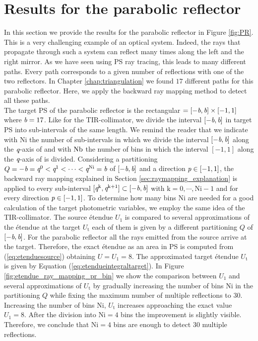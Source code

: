 \section{Results for the parabolic reflector}\label{sec:PR}
In this section we provide the results for the parabolic reflector in Figure \ref{fig:PR}.
This is a very challenging example of an optical system. Indeed, the rays that propagate through such a system can reflect many times along the left and the right mirror. As we have seen using PS ray tracing, this leads to many different paths. Every path corresponds to a given number of reflections with one of the two reflectors. In Chapter \ref{chap:triangulation} we found $17$ different paths for this parabolic reflector. Here, we apply the backward ray mapping method to detect all these paths. \\ \indent
The target PS of the parabolic reflector is the rectangular $=[-\textit{b}, \textit{b}]\times[-1,1]$ where $\textit{b}=17$. Like for the TIR-collimator, we divide the interval $[-\textit{b}, \textit{b}]$ in target PS into sub-intervals of the same length. We remind the reader that we indicate with $\textrm{Ni}$ the number of sub-intervals in which we divide the interval $[-\textit{b}, \textit{b}]$ along the $\textit{q}$-axis of  and with $\textrm{Nb}$ the number of bins in which the interval $[-1,1]$ along the $\textit{q}$-axis of  is divided. Considering a partitioning $Q = -\textit{b}=\textit{q}^{0}<\textit{q}^{1}<\cdots<\textit{q}^{\textrm{Ni}}=\textit{b}$ of $[-\textit{b}, \textit{b}]$ and a direction $\textit{p}\in[-1,1]$, the backward ray mapping explained in Section \ref{sec:raymapping_explanation} is applied to every sub-interval $[\textit{q}^{\textrm{k}}, \textit{q}^{\textrm{k+1}}]\subset[-\textit{b}, \textit{b}]$ with $\textrm{k}=0, \cdots, \textrm{Ni}-1$ and for every direction $\textit{p}\in[-1,1]$. To determine how many bins $\textrm{Ni}$ are needed for a good calculation of the target photometric variables, we employ the same idea of the TIR-collimator. The source \'{e}tendue $U_1$ is compared to several approximations of the \'{e}tendue at the target $U_{\textrm{t}}$ each of them is given by a different partitioning $Q$ of $[-\textit{b}, \textit{b}]$. For the parabolic reflector all the rays emitted from the source arrive at the target. Therefore, the exact \'{e}tendue as an area in PS is computed from (\ref{eq:etenduesource}) obtaining $U=U_1=8$. The approximated target \'{e}tendue $U_{\textrm{t}}$ is given by Equation (\ref{eq:etendueintegraltarget}). In Figure \ref{fig:etendue_ray_mapping_pr_bin} we show the comparison between $U_1$ and several approximations of $U_{\textrm{t}}$ by gradually increasing the number of bins $\textrm{Ni}$ in the partitioning $Q$ while fixing the maximum number of multiple reflections to $30$. Increasing the number of bins $\textrm{Ni}$, $U_{\textrm{t}}$ increases approaching the exact value $U_1=8$. After the division into $\textrm{Ni}=4$ bins the improvement is slightly visible. Therefore, we conclude that $\textrm{Ni}=4$ bins are enough to detect $30$ multiple reflections.
